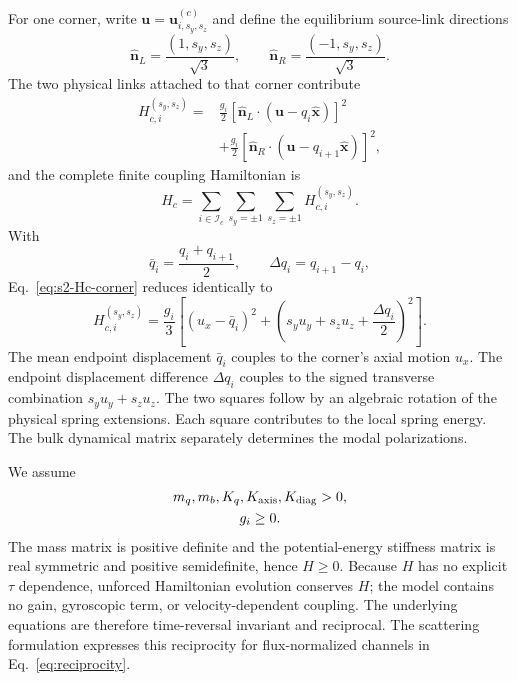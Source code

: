 \documentclass[10pt,aps,onecolumn,floatfix,notitlepage,nofootinbib,showkeys]{revtex4-2}
\newcommand{\vu}{\bm{u}}
\newcommand{\ex}{\hat{\bm{x}}}
\newcommand{\Ic}{\mathcal I_c}
\begin{document}
For one corner, write $\vu=\vu_{i,s_y,s_z}^{(c)}$ and define the equilibrium source-link directions
\begin{equation}
  \hat{\bm n}_L=\frac{(1,s_y,s_z)}{\sqrt3},
  \qquad
  \hat{\bm n}_R=\frac{(-1,s_y,s_z)}{\sqrt3}.
  \label{eq:s2-source-directions}
\end{equation}
The two physical links attached to that corner contribute
\begin{align}
  H_{c,i}^{(s_y,s_z)}
  ={}&\frac{g_i}{2}
  \left[
  \hat{\bm n}_L\cdot(\vu-q_i\ex)
  \right]^2
  \nonumber\\
  &+\frac{g_i}{2}
  \left[
  \hat{\bm n}_R\cdot(\vu-q_{i+1}\ex)
  \right]^2,
  \label{eq:s2-Hc-corner}
\end{align}
and the complete finite coupling Hamiltonian is
\begin{equation}
  H_c
  =\sum_{i\in\Ic}
   \sum_{s_y=\pm1}
   \sum_{s_z=\pm1}
   H_{c,i}^{(s_y,s_z)}.
  \label{eq:s2-Hc-total}
\end{equation}
With
\begin{equation}
  \bar q_i=\frac{q_i+q_{i+1}}{2},
  \qquad
  \Delta q_i=q_{i+1}-q_i,
  \label{eq:s2-qbar-delta}
\end{equation}
Eq.~\eqref{eq:s2-Hc-corner} reduces identically to
\begin{equation}
  H_{c,i}^{(s_y,s_z)}
  =\frac{g_i}{3}
  \left[
  (u_x-\bar q_i)^2
  +\left(
  s_yu_y+s_zu_z+\frac{\Delta q_i}{2}
  \right)^2
  \right].
  \label{eq:s2-Hc-reduced}
\end{equation}
The mean endpoint displacement $\bar q_i$ couples to the corner's axial motion $u_x$. The endpoint displacement difference $\Delta q_i$ couples to the signed transverse combination $s_yu_y+s_zu_z$. The two squares follow by an algebraic rotation of the physical spring extensions. Each square contributes to the local spring energy. The bulk dynamical matrix separately determines the modal polarizations.

We assume
\begin{equation}
\begin{gathered}
  m_q,m_b,K_q,K_{\rm axis},K_{\rm diag}>0,\\
  g_i\ge0.
\end{gathered}
\label{eq:s2-positivity}
\end{equation}
The mass matrix is positive definite and the potential-energy stiffness matrix is real symmetric and positive semidefinite, hence $H\ge0$. Because $H$ has no explicit $\tau$ dependence, unforced Hamiltonian evolution conserves $H$; the model contains no gain, gyroscopic term, or velocity-dependent coupling. The underlying equations are therefore time-reversal invariant and reciprocal. The scattering formulation expresses this reciprocity for flux-normalized channels in Eq.~\eqref{eq:reciprocity}.
\end{document}
